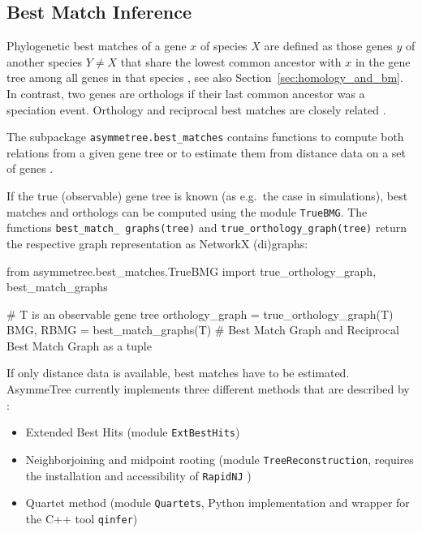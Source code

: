 \documentclass[hidelinks,11pt]{scrreprt}
\begin{document}
\subsection{Best Match Inference}

Phylogenetic best matches of a gene $x$ of species $X$ are defined as those genes $y$ of another species $Y\ne X$ that share the lowest common ancestor with $x$ in the gene tree among all genes in that species \citep{geiss2019a,geiss2020b,geiss2020c}, see also Section~\ref{sec:homology_and_bm}.
In contrast, two genes are orthologs if their last common ancestor was a speciation event.
Orthology and reciprocal best matches are closely related \citep{geiss2020c}.

The subpackage \texttt{asymmetree.best\_matches} contains functions to compute both relations from a given gene tree or to estimate them from distance data on a set of genes \citep{stadler2020}.

If the true (observable) gene tree is known (as e.g.\ the case in simulations), best matches and orthologs can be computed using the module \texttt{TrueBMG}.
The functions \texttt{best\_match\_ graphs(tree)} and \texttt{true\_orthology\_graph(tree)} return the respective graph representation as NetworkX (di)graphs:

\vspace{2mm}
\begin{python}
from asymmetree.best_matches.TrueBMG import true_orthology_graph, best_match_graphs

# T is an observable gene tree
orthology_graph = true_orthology_graph(T)
BMG, RBMG = best_match_graphs(T)    # Best Match Graph and Reciprocal Best Match Graph as a tuple
\end{python}
\vspace{2mm}

If only distance data is available, best matches have to be estimated.
AsymmeTree currently implements three different methods that are described by \citet{stadler2020}:
\begin{itemize}
	\item Extended Best Hits (module \texttt{ExtBestHits})
	\item Neighborjoining and midpoint rooting (module \texttt{TreeReconstruction}, requires the installation and accessibility of \texttt{RapidNJ} \citep{simonsen2008})
	\item Quartet method (module \texttt{Quartets}, Python implementation and wrapper for the C++ tool \texttt{qinfer})
\end{itemize}
\end{document}

